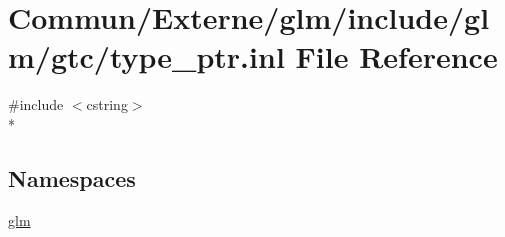 \hypertarget{type__ptr_8inl}{}\section{Commun/\+Externe/glm/include/glm/gtc/type\+\_\+ptr.inl File Reference}
\label{type__ptr_8inl}
{\ttfamily \#include $<$cstring$>$}\\*
\subsection*{Namespaces}
\begin{DoxyCompactItemize}
\item 
 \hyperlink{namespaceglm}{glm}
\end{DoxyCompactItemize}
